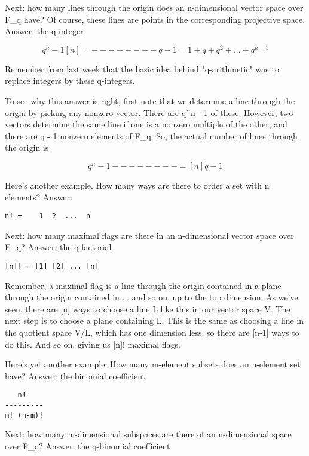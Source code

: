 Next: how many lines through the origin does an n-dimensional vector
space over F_{q} have?  Of course, these lines are points in the
corresponding projective space.  Answer: the q-integer

$$
          q^{n} - 1
[n]  =   --------   
           q - 1

     = 1 + q + q^{2} + ... + q^{n-1}
$$
    
Remember from last week that the basic idea behind "q-arithmetic" was
to replace integers by these q-integers.  

To see why this answer is right, first note that we determine a line
through the origin by picking any nonzero vector.  There are q^{n} - 1
of these.  However, two vectors determine the same line if one is a
nonzero multiple of the other, and there are q - 1 nonzero elements 
of F_{q}.  So, the actual number of lines through the origin is

$$
 q^{n} - 1
-------- = [n]
 q - 1
$$
    
Here's another example.  How many ways are there to order a set with n
elements?  Answer:

\begin{verbatim}
n! =    1  2  ...  n
\end{verbatim}
    
Next: how many maximal flags are there in an n-dimensional vector space
over F_{q}?  Answer: the q-factorial 

\begin{verbatim}
[n]! = [1] [2] ... [n]
\end{verbatim}
    
Remember, a maximal flag is a line through the origin contained in a
plane through the origin contained in ... and so on, up to the top
dimension.  As we've seen, there are [n] ways to choose a line L like
this in our vector space V.  The next step is to choose a plane
containing L.  This is the same as choosing a line in the quotient space
V/L, which has one dimension less, so there are [n-1] ways to do this. 
And so on, giving us [n]! maximal flags.

Here's yet another example.  How many m-element subsets does an
n-element set have?  Answer: the binomial coefficient 

\begin{verbatim}
   n! 
---------
m! (n-m)!
\end{verbatim}
    
Next: how many m-dimensional subspaces are there of an n-dimensional
space over F_{q}?  Answer: the q-binomial coefficient

